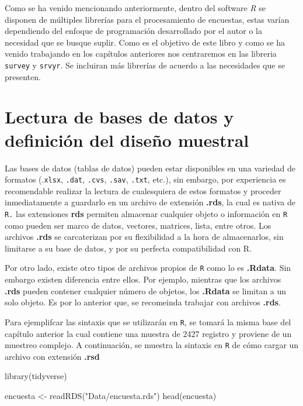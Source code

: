 \documentclass[
  12pt,
]{book}
\newenvironment{Shaded}{\begin{snugshade}}{\end{snugshade}}
\newcommand{\FunctionTok}[1]{\textcolor[rgb]{0.00,0.00,0.00}{#1}}
\newcommand{\NormalTok}[1]{#1}
\newcommand{\OtherTok}[1]{\textcolor[rgb]{0.56,0.35,0.01}{#1}}
\newcommand{\StringTok}[1]{\textcolor[rgb]{0.31,0.60,0.02}{#1}}
\begin{document}
Como se ha venido mencionando anteriormente, dentro del software \emph{R} se disponen de múltiples librerías para el procesamiento de encuestas, estas varían dependiendo del enfoque de programación desarrollado por el autor o la necesidad que se busque suplir. Como es el objetivo de este libro y como se ha venido trabajando en los capítulos anteriores nos centraremos en las libreria \texttt{survey} y \texttt{srvyr}. Se incluiran más librerías de acuerdo a las necesidades que se presenten.

\hypertarget{lectura-de-bases-de-datos-y-definiciuxf3n-del-diseuxf1o-muestral}{%
\section{Lectura de bases de datos y definición del diseño muestral}\label{lectura-de-bases-de-datos-y-definiciuxf3n-del-diseuxf1o-muestral}}

Las bases de datos (tablas de datos) pueden estar disponibles en una variedad de formatos (.\texttt{xlsx}, \texttt{.dat}, \texttt{.cvs}, \texttt{.sav}, \texttt{.txt}, etc.), sin embargo, por experiencia es recomendable realizar la lectura de cualesquiera de estos formatos y proceder inmediatamente a guardarlo en un archivo de extensión \textbf{.rds}, la cual es nativa de \texttt{R.} las extensiones \textbf{rds} permiten almacenar cualquier objeto o información en \texttt{R} como pueden ser marco de datos, vectores, matrices, lista, entre otros. Los archivos \textbf{.rds} se carcaterizan por su flexibilidad a la hora de almacenarlos, sin limitarse a su base de datos, y por su perfecta compatibilidad con R.

Por otro lado, existe otro tipos de archivos propios de \texttt{R} como lo es \textbf{.Rdata}. Sin embargo existen diferencia entre ellos. Por ejemplo, mientras que los archivos \textbf{.rds} pueden contener cualquier número de objetos, los \textbf{.Rdata} se limitan a un solo objeto. Es por lo anterior que, se recomeinda trabajar con archivos \textbf{.rds}.

Para ejemplifcar las sintaxis que se utilizarán en \texttt{R}, se tomará la misma base del capítulo anterior la cual contiene una muestra de 2427 registro y proviene de un muestreo complejo. A continuación, se muestra la sintaxis en \texttt{R} de cómo cargar un archivo con extensión \textbf{.rsd}

\begin{Shaded}
\begin{Highlighting}[]
\FunctionTok{library}\NormalTok{(tidyverse)}

\NormalTok{encuesta }\OtherTok{\textless{}{-}} \FunctionTok{readRDS}\NormalTok{(}\StringTok{"Data/encuesta.rds"}\NormalTok{)}
\FunctionTok{head}\NormalTok{(encuesta)}
\end{Highlighting}
\end{Shaded}
\end{document}
